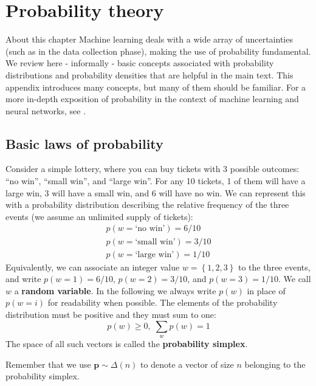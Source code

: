 \chapter{Probability theory}
\label{chap:probability_theory}

\begin{supportbox}{About this chapter}
Machine learning deals with a wide array of uncertainties (such as in the data collection phase), making the use of probability fundamental. We review here - informally - basic concepts associated with probability distributions and probability densities that are helpful in the main text. This appendix introduces many concepts, but many of them should be familiar. For a more in-depth exposition of probability in the context of machine learning and neural networks, see \cite{bishop2006pattern,bishop2024deep}.
\end{supportbox}

\section{Basic laws of probability}

Consider a simple lottery, where you can buy tickets with 3 possible outcomes: “no win”, “small win”, and “large win”. For any 10 tickets, 1 of them will have a large win, 3 will have a small win, and 6 will have no win. We can represent this with a probability distribution describing the relative frequency of the three events (we assume an unlimited supply of tickets):
%
\begin{gather*}
p(w=\text{`no win'})=6/10 \\
p(w=\text{`small win'})=3/10\\
p(w=\text{`large win'})=1/10
\end{gather*}
%
Equivalently, we can associate an integer value $w=\left\{1,2,3\right\}$ to the three events, and write $p(w=1)=6/10$, $p(w=2)=3/10$, and $p(w=3)=1/10$. We call $w$ a \textbf{random variable}. In the following we always write $p(w)$ in place of $p(w=i)$ for readability when possible. The elements of the probability distribution must be positive and they must sum to one:
%
$$
p(w)\ge0,\;\sum_wp(w)=1
$$
%
The space of all such vectors is called the \textbf{probability simplex}. 

\begin{tcolorbox}
Remember that we use $\mathbf{p} \sim \Delta(n)$ to denote a vector of size $n$ belonging to the probability simplex. 
\end{tcolorbox}

